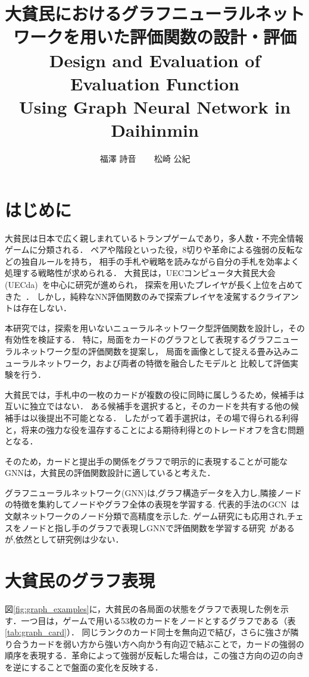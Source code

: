 \documentclass[a4j,dvipdfmx]{jarticle}
\title{大貧民におけるグラフニューラルネットワークを用いた評価関数の設計・評価 \\
\vspace{0.3em}
\large Design and Evaluation of Evaluation Function \\ Using Graph Neural Network in Daihinmin}
\author{福澤 詩音   ~~~ 松崎 公紀 ~~~~}
\begin{document}
\begin{Abstract}
 
 \section{はじめに}
大貧民は日本で広く親しまれているトランプゲームであり，多人数・不完全情報ゲームに分類される．
ペアや階段といった役，8切りや革命による強弱の反転などの独自ルールを持ち，
相手の手札や戦略を読みながら自分の手札を効率よく処理する戦略性が求められる．
大貧民は，UECコンピュータ大貧民大会(UECda)~\cite{bib:uecdda}を中心に研究が進められ，
探索を用いたプレイヤが長く上位を占めてきた~\cite{bib:ohto2016}．
しかし，純粋なNN評価関数のみで探索プレイヤを凌駕するクライアントは存在しない．

本研究では，探索を用いないニューラルネットワーク型評価関数を設計し，その有効性を検証する．
特に，局面をカードのグラフとして表現するグラフニューラルネットワーク型の評価関数を提案し，
局面を画像として捉える畳み込みニューラルネットワーク，および両者の特徴を融合したモデルと
比較して評価実験を行う．

大貧民では，手札中の一枚のカードが複数の役に同時に属しうるため，候補手は互いに独立ではない．
ある候補手を選択すると，そのカードを共有する他の候補手は以後提出不可能となる．
したがって着手選択は，その場で得られる利得と，将来の強力な役を温存することによる期待利得とのトレードオフを含む問題となる．

そのため，カードと提出手の関係をグラフで明示的に表現することが可能なGNNは，大貧民の評価関数設計に適していると考えた．

グラフニューラルネットワーク(GNN)は,グラフ構造データを入力し,隣接ノードの特徴を集約してノードやグラフ全体の表現を学習する.
代表的手法のGCN~\cite{bib:gcn}は文献ネットワークのノード分類で高精度を示した.
ゲーム研究にも応用され,チェスをノードと指し手のグラフで表現しGNNで評価関数を学習する研究~\cite{bib:alphagateau}があるが,依然として研究例は少ない．



\section{大貧民のグラフ表現}
図\ref{fig:graph_examples}に，大貧民の各局面の状態をグラフで表現した例を示す．一つ目は，ゲームで用いる53枚のカードをノードとするグラフである（表\ref{tab:graph_card}）．
同じランクのカード同士を無向辺で結び，さらに強さが隣り合うカードを弱い方から強い方へ向かう有向辺で結ぶことで，カードの強弱の順序を表現する．革命によって強弱が反転した場合は，この強さ方向の辺の向きを逆にすることで盤面の変化を反映する．


\end{Abstract}
\end{document}
